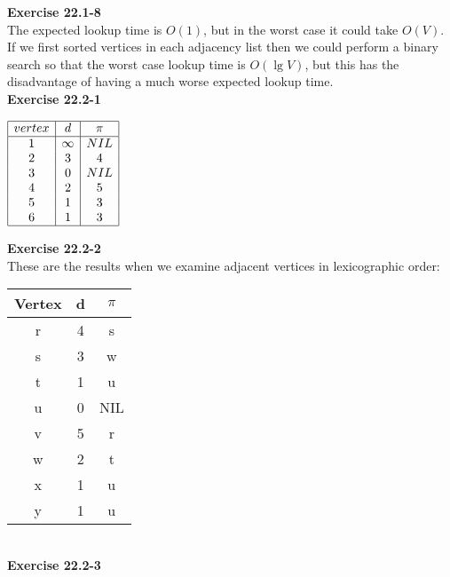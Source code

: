 \documentclass{article}
\begin{document}
\noindent\textbf{Exercise 22.1-8}\\

The expected lookup time is $O(1)$, but in the worst case it could take $O(V)$. If we first sorted vertices in each adjacency list then we could perform a binary search so that the worst case lookup time is $O(\lg V)$, but this has the disadvantage of having a much worse expected lookup time.  \\

\noindent\textbf{Exercise 22.2-1}\\

\begin{center}
$\begin{array}{|c|c|c|}
\hline
vertex& d&\pi\\
\hline
1&\infty&NIL\\
2&3&4\\
3&0&NIL\\
4&2&5\\
5&1&3\\
6&1&3\\
\hline
\end{array}
$
\end{center}

\noindent\textbf{Exercise 22.2-2}\\

These are the results when we examine adjacent vertices in lexicographic order:

\begin{tabular}{c|c|c}
Vertex & d & $\pi$ \\ \hline
r & 4 & s \\ \hline
s & 3 & w \\ \hline
t & 1 & u \\ \hline
u & 0 & NIL \\ \hline
v & 5 & r \\ \hline
w & 2 & t \\ \hline
x & 1 & u \\ \hline
y & 1 & u \\ \hline
\end{tabular}\\

\noindent\textbf{Exercise 22.2-3}\\
\end{document}

